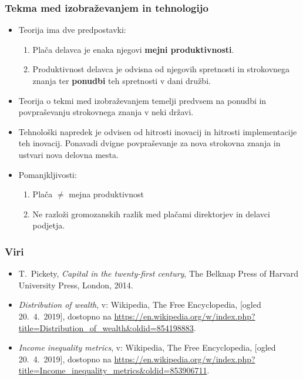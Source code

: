\documentclass[10pt]{beamer}
\begin{document}
\begin{frame}
\frametitle{Tekma med izobraževanjem in tehnologijo}
\begin{itemize}
\item Teorija ima dve predpostavki:
\begin{enumerate}
\item Plača delavca je enaka njegovi \textbf{mejni produktivnosti}.
\item Produktivnost delavca je odvisna od njegovih spretnosti in strokovnega znanja ter \textbf{ponudbi} teh spretnosti v dani družbi.
\end{enumerate}


\item Teorija o tekmi med izobraževanjem temelji predvsem na ponudbi in povpraševanju strokovnega znanja v neki državi. 
\item Tehnološki napredek je odvisen od hitrosti inovacij in hitrosti implementacije teh inovacij. Ponavadi dvigne povpraševanje za nova strokovna znanja in ustvari nova delovna mesta.


\item Pomanjkljivosti:
\begin{enumerate}
\item Plača $\neq$ mejna produktivnost
\item Ne razloži gromozanskih razlik med plačami direktorjev in delavci podjetja.
\end{enumerate}
\end{itemize}
\end{frame}


\begin{frame}
\frametitle{Viri}
	\begin{itemize}
		\item
			\label{Pickety}
			T.~Pickety, \emph{Capital in the twenty-first century}, The Belknap Press of 						Harvard University Press, London, 2014.

		\item 
			\label{Razdelitev premoženja}
			\emph{Distribution of wealth}, v: Wikipedia, The Free Encyclopedia, [ogled 							20.~4.~2019], dostopno na \url{https://en.wikipedia.org/w/index.php?								title=Distribution_of_wealth&oldid=854198883}.

		\item 
			\label{Metrike ekonomske neenakosti}
			\emph{Income inequality metrics}, v: Wikipedia, The Free Encyclopedia, [ogled 					20.~4.~2019], dostopno na \url{https://en.wikipedia.org/w/index.php?								title=Income_inequality_metrics&oldid=853906711}.
\end{itemize}
\end {frame}
\end{document}
